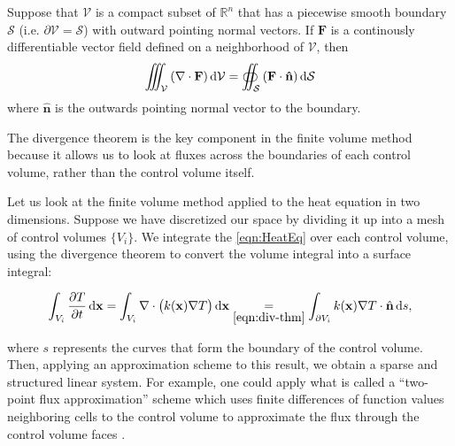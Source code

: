 \begin{thm}
	Suppose that $\mathcal{V}$ is a compact subset of $\mathbb{R}^n$ that has a piecewise smooth boundary $\mathcal{S}$ (i.e. $\partial\mathcal{V}=\mathcal{S}$) with outward pointing normal vectors. If $\mathbf{F}$ is a continously differentiable vector field defined on a neighborhood of $\mathcal{V}$, then
	\begin{equation}
		\iiint_{\mathcal{V}}\left(\nabla\cdot\mathbf{F}\right)\dif\mathcal{V}=\oiint_{\mathcal{S}}\left(\mathbf{F}\cdot\mathbf{\hat{n}}\right)\dif\mathcal{S}\label{eqn:div-thm}
	\end{equation}
	where $\hat{\mathbf{n}}$ is the outwards pointing normal vector to the boundary.
	\label{thm:div-thm}
\end{thm}

The divergence theorem is the key component in the finite volume method because it allows us to look at fluxes across the boundaries of each control volume, rather than the control volume itself.

Let us look at the finite volume method applied to the heat equation in two dimensions. Suppose we have discretized our space by dividing it up into a mesh of control volumes $\lbrace V_i\rbrace$. We integrate the \eqref{eqn:HeatEq} over each control volume, using the divergence theorem to convert the volume integral into a surface integral:

\begin{equation}
	\int_{V_i}\frac{\partial T}{\partial t}\dif\mathbf{x}=\int_{V_i}\nabla\cdot \left(k(\mathbf{x})\nabla T\right)\dif\mathbf{x}\underset{\eqref{eqn:div-thm}}{=}\int_{\partial V_i}k(\mathbf{x})\nabla T\cdot\hat{\mathbf{n}}\dif s,\label{eqn:Vol-to-Surface-FVM}
\end{equation}

where $s$ represents the curves that form the boundary of the control volume. Then, applying an approximation scheme to this result, we obtain a sparse and structured linear system. For example, one could apply what is called a ``two-point flux approximation'' scheme which uses finite differences of function values neighboring cells to the control volume to approximate the flux through the control volume faces \cite{Versteeg2007}.

